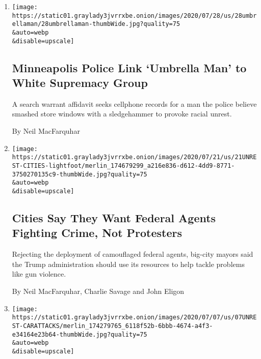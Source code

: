 \begin{enumerate}
\def\labelenumi{\arabic{enumi}.}
\item
  \href{/2020/07/28/us/umbrella-man-identified-minneapolis.html}{}

  \texttt{[image: https://static01.graylady3jvrrxbe.onion/images/2020/07/28/us/28umbrellaman/28umbrellaman-thumbWide.jpg?quality=75\\\&auto=webp\\\&disable=upscale]}

  \hypertarget{minneapolis-police-link-umbrella-man-to-white-supremacy-group}{%
  \subsection{Minneapolis Police Link `Umbrella Man' to White Supremacy
  Group}\label{minneapolis-police-link-umbrella-man-to-white-supremacy-group}}

  A search warrant affidavit seeks cellphone records for a man the
  police believe smashed store windows with a sledgehammer to provoke
  racial unrest.

  By Neil MacFarquhar
\item
  \href{/2020/07/21/us/trump-federal-agents-chicago.html}{}

  \texttt{[image: https://static01.graylady3jvrrxbe.onion/images/2020/07/21/us/21UNREST-CITIES-lightfoot/merlin\_174679299\_a216e836-d612-4dd9-8771-3750270135c9-thumbWide.jpg?quality=75\\\&auto=webp\\\&disable=upscale]}

  \hypertarget{cities-say-they-want-federal-agents-fighting-crime-not-protesters}{%
  \subsection{Cities Say They Want Federal Agents Fighting Crime, Not
  Protesters}\label{cities-say-they-want-federal-agents-fighting-crime-not-protesters}}

  Rejecting the deployment of camouflaged federal agents, big-city
  mayors said the Trump administration should use its resources to help
  tackle problems like gun violence.

  By Neil MacFarquhar, Charlie Savage and John Eligon
\item
  \href{/2020/07/07/us/bloomington-car-attack-protesters.html}{}

  \texttt{[image: https://static01.graylady3jvrrxbe.onion/images/2020/07/07/us/07UNREST-CARATTACKS/merlin\_174279765\_6118f52b-6bbb-4674-a4f3-e34164e23b64-thumbWide.jpg?quality=75\\\&auto=webp\\\&disable=upscale]}


\end{enumerate}
